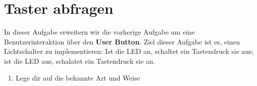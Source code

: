 \section{\ExercisePrefixEmbeddedC Taster abfragen \optional}

In dieser Aufgabe erweitern wir die vorherige Aufgabe um eine Benutzerinteraktion über den \textbf{User Button}.
Ziel dieser Aufgabe ist es, einen Lichtschalter zu implementieren:
Ist die LED an, schaltet ein Tastendruck sie aus; ist die LED aus, schalatet ein Tastendruck sie an.

\begin{enumerate}
\item 
Lege dir auf die bekannte Art und Weise
\end{enumerate}
